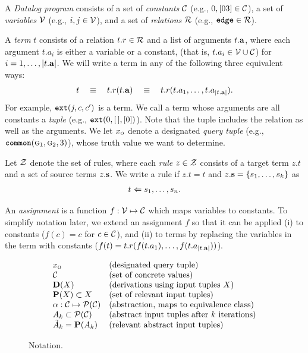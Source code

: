 
A {\em Datalog program} consists of
a set of {\em constants} $\mathcal{C}$ (e.g., $0,[03] \in \mathcal{C}$),
a set of {\em variables} $\mathcal{V}$ (e.g., $i, j \in \mathcal{V}$), and
a set of {\em relations} $\mathcal{R}$ (e.g., $\text{\tt edge} \in \mathcal{R}$).

A {\em term} $t$ consists of a relation $t.r \in \mathcal{R}$ and a list of arguments $t.\mathbf{a}$,
where each argument $t.a_i$ is either a variable or a constant,
(that is, $t.a_i \in \mathcal{V} \cup \mathcal{C}$) for $i = 1, \dots, |t.\mathbf{a}|$.
We will write a term in any of the following three equivalent ways:
\begin{align}
t \quad\equiv\quad t.r(t.\mathbf{a}) \quad\equiv\quad t.r(t.a_1, \dots, t.a_{|t.\mathbf{a}|}).
\end{align}
For example, $\text{\tt ext}(j,c,c')$ is a term.
We call a term whose arguments are all constants a {\em tuple}
(e.g., $\text{\tt ext}(0, [\,], [0])$).
Note that the tuple includes the relation as well as the arguments.
We let $x_\text{\sc o}$ denote a designated {\em query tuple} (e.g., $\text{\tt common}(\text{\sc g}_1,\text{\sc g}_2,3)$),
whose truth value we want to determine.

Let $\mathcal{Z}$ denote the set of rules,
where each {\em rule} $z \in \mathcal{Z}$ consists of a target term $z.t$ and a set of source terms $z.\mathbf{s}$.
We write a rule if $z.t = t$ and $z.\mathbf{s} = \{ s_1, \dots, s_k \}$ as
\begin{align}
t \Leftarrow s_1, \dots, s_n.
\end{align}

An {\em assignment} is a function $f : \mathcal{V} \mapsto \mathcal{C}$ which maps variables to
constants.  To simplify notation later, we extend an assignment $f$ so that it
can be applied (i) to constants ($f(c) = c$ for $c \in \mathcal{C}$), and (ii) to terms by
replacing the variables in the term with constants ($f(t) = t.r(f(t.a_1), \dots, f(t.a_{|t.\mathbf{a}|}))$).

\begin{figure}[ht]
\[
\begin{array}{ll}
x_\text{\sc o}                           & \text{(designated query tuple)} \\
\mathcal{C}                           & \text{(set of concrete values)} \\
\mathbf{D}(X)                        & \text{(derivations using input tuples $X$)} \\
\mathbf{P}(X) \subset X              & \text{(set of relevant input tuples)} \\
\alpha : \mathcal{C} \mapsto \mathcal{P}(\mathcal{C}) & \text{(abstraction, maps to equivalence class)} \\
A_k \subset \mathcal{P}(\mathcal{C})          & \text{(abstract input tuples after $k$ iterations)} \\
\tilde A_k = \mathbf{P}(A_k)         & \text{(relevant abstract input tuples)} \\
\end{array}
\]
\caption{\label{fig:notation} Notation.}
\end{figure}


